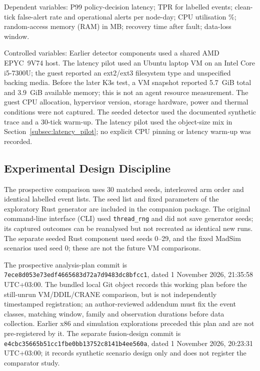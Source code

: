 \documentclass{ieeeaccess}
\begin{document}
{Dependent variables:} P99 policy-decision latency; TPR for labelled events; clean-tick false-alert rate and operational alerts per node-day; CPU utilisation \%; random-access memory (RAM) in MB; recovery time after fault; data-loss window.

{Controlled variables:} Earlier detector components used a shared AMD EPYC~9V74 host. The latency pilot used an Ubuntu laptop VM on an Intel Core i5-7300U; the guest reported an ext2/ext3 filesystem type and unspecified backing media. Before the later K3s test, a VM snapshot reported 5.7~GiB total and 3.9~GiB available memory; this is not an agent resource measurement. The guest CPU allocation, hypervisor version, storage hardware, power and thermal conditions were not captured. The seeded detector used the documented synthetic trace and a 30-tick warm-up. The latency pilot used the object-size mix in Section~\ref{subsec:latency_pilot}; no explicit CPU pinning or latency warm-up was recorded.

\subsection{Experimental Design Discipline}
\label{subsec:design}

The prospective comparison uses 30 matched seeds, interleaved arm order and identical labelled event lists. The seed list and fixed parameters of the exploratory Rust generator are included in the companion package. The original command-line interface (CLI) used \texttt{thread\_rng} and did not save generator seeds; its captured outcomes can be reanalysed but not recreated as identical new runs. The separate seeded Rust component used seeds 0--29, and the fixed MadSim scenarios used seed 0; these are not the future VM comparisons.

The prospective analysis-plan commit is \texttt{7ece8}\allowbreak\texttt{d053e}\allowbreak\texttt{73edf}\allowbreak\texttt{46656}\allowbreak\texttt{83d72}\allowbreak\texttt{a7d94}\allowbreak\texttt{83dc8}\allowbreak\texttt{bfcc1}, dated 1 November 2026, 21:35:58 UTC+03:00. The bundled local Git object records this working plan before the still-unrun VM/DDIL/CRANE comparison, but is not independently timestamped registration; an author-reviewed addendum must fix the event classes, matching window, family and observation durations before data collection. Earlier x86 and simulation explorations preceded this plan and are not pre-registered by it. The separate fusion-design commit is \texttt{e4cbc}\allowbreak\texttt{35665}\allowbreak\texttt{b51cc}\allowbreak\texttt{1fbe0}\allowbreak\texttt{bb137}\allowbreak\texttt{52c81}\allowbreak\texttt{41b4e}\allowbreak\texttt{e560a}, dated 1 November 2026, 20:23:31 UTC+03:00; it records synthetic scenario design only and does not register the comparator study.
\end{document}
